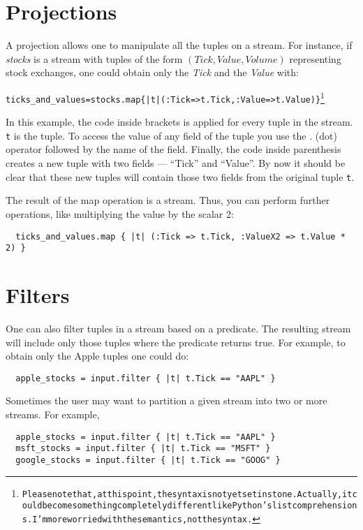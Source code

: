 \documentclass[twoside]{report}
\newcommand{\tuple}[1]{$(#1)$}
\begin{document}
\section{Projections}
A projection allows one to manipulate all the tuples on a stream. For instance, if \emph{stocks} is a stream with tuples of the form \tuple{Tick, Value, Volume} representing stock exchanges, one could obtain only the \emph{Tick} and the \emph{Value} with:
\begin{alltt}
  ticks_and_values = stocks.map \{ |t| (:Tick => t.Tick, :Value => t.Value) \}\footnote{Please note that, at this point, the syntax is not yet set in stone. Actually, it could become something completely different like Python's list comprehensions. I'm more worried with the semantics, not the syntax.}
\end{alltt}
In this example, the code inside brackets is applied for every tuple in the stream. \verb=t= is the tuple. To access the value of any field of the tuple you use the . (dot) operator followed by the name of the field. Finally, the code inside parenthesis creates a new tuple with two fields --- ``Tick'' and ``Value''. By now it should be clear that these new tuples will contain those two fields from the original tuple \verb=t=.

The result of the map operation is a stream. Thus, you can perform further operations, like multiplying the value by the scalar 2:

\begin{verbatim}
  ticks_and_values.map { |t| (:Tick => t.Tick, :ValueX2 => t.Value * 2) }
\end{verbatim}

\section{Filters}

One can also filter tuples in a stream based on a predicate. The resulting stream will include only those tuples where the predicate returns true. For example, to obtain only the Apple tuples one could do:

\begin{verbatim}
  apple_stocks = input.filter { |t| t.Tick == "AAPL" }
\end{verbatim}

Sometimes the user may want to partition a given stream into two or more streams. For example,

\begin{verbatim}
  apple_stocks = input.filter { |t| t.Tick == "AAPL" }
  msft_stocks = input.filter { |t| t.Tick == "MSFT" }
  google_stocks = input.filter { |t| t.Tick == "GOOG" }
\end{verbatim}
\end{document}
